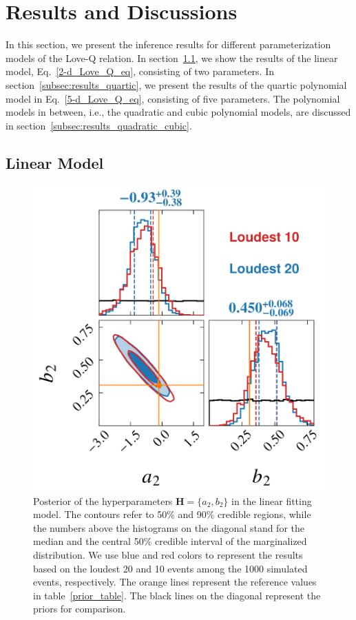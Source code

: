 \documentclass[a4paper,11pt]{article}
\newcommand{\ZW}[1]{\textcolor{magenta}{$\mathcal{ZW}$:~#1}}
\begin{document}
\section{Results and Discussions}
\label{sec:results}
In this section, we present the inference results for different parameterization 
models of the Love-Q relation. In section~\ref{subsec:results_linear_model}, we 
show the results of the linear model, Eq.~\eqref{2-d_Love_Q_eq}, consisting of two parameters.
In section~\ref{subsec:results_quartic}, we present the results of the quartic 
polynomial model in Eq.~\eqref{5-d_Love_Q_eq}, consisting of five parameters. The 
polynomial models in between, i.e., the quadratic and cubic polynomial models, are 
discussed in section~\ref{subsec:results_quadratic_cubic}.
\subsection{Linear Model}
\label{subsec:results_linear_model}
\begin{figure}[t]
    \centering
    \includegraphics[width=0.5\linewidth]{comparison_corner_plot.pdf}
    \caption{Posterior of the hyperparameters ${\bm H} = \{a_2,b_2\}$
     in the linear fitting model. The contours refer to 50\% and 90\% credible
     regions, while the numbers above the histograms on the diagonal stand 
    for the median and the central 50\% credible interval of the marginalized
     distribution. We use blue and red colors to represent the results based on
     the loudest 20 and 10 events among the 1000
    simulated events, respectively.
     The orange lines represent the reference values in table~\ref{prior_table}.
     The black lines on the diagonal represent the priors for comparison.}
    \label{corner2-d}
\end{figure}
\end{document}
